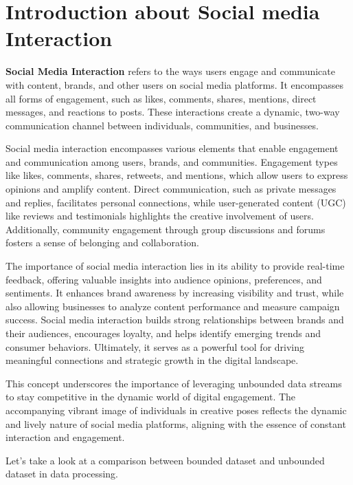 \documentclass[12pt, a4paper]{article}
\begin{document}
\tableofcontents
\newpage

\listoffigures
\listoftables
\newpage


\section{Introduction about Social media Interaction}
\textbf{Social Media Interaction} refers to the ways users engage and
communicate with content, brands, and other users on social media platforms. It
encompasses all forms of engagement, such as likes, comments, shares, mentions,
direct messages, and reactions to posts. These interactions create a dynamic,
two-way communication channel between individuals, communities, and businesses.

Social media interaction encompasses various elements that enable engagement and
communication among users, brands, and communities. Engagement types like likes,
comments, shares, retweets, and mentions, which allow users to express opinions
and amplify content. Direct communication, such as private messages and replies,
facilitates personal connections, while user-generated content (UGC) like
reviews and testimonials highlights the creative involvement of users.
Additionally, community engagement through group discussions and forums fosters
a sense of belonging and collaboration. 

The importance of social media interaction lies in its ability to provide
real-time feedback, offering valuable insights into audience opinions,
preferences, and sentiments. It enhances brand awareness by increasing
visibility and trust, while also allowing businesses to analyze content
performance and measure campaign success. Social media interaction builds strong
relationships between brands and their audiences, encourages loyalty, and helps
identify emerging trends and consumer behaviors. Ultimately, it serves as a
powerful tool for driving meaningful connections and strategic growth in the
digital landscape.

This concept underscores the importance of leveraging unbounded data streams to
stay competitive in the dynamic world of digital engagement. The accompanying
vibrant image of individuals in creative poses reflects the dynamic and lively
nature of social media platforms, aligning with the essence of constant
interaction and engagement.

Let's take a look at a comparison between bounded dataset and unbounded dataset
in data processing.
\end{document}
